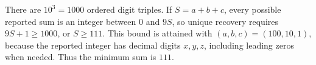 There are $10^3=1000$ ordered digit triples. If $S=a+b+c$, every possible reported sum is an integer between $0$ and $9S$, so unique recovery requires $9S+1\ge1000$, or $S\ge111$. This bound is attained with $(a,b,c)=(100,10,1)$, because the reported integer has decimal digits $x,y,z$, including leading zeros when needed. Thus the minimum sum is $\boxed{111}$.
